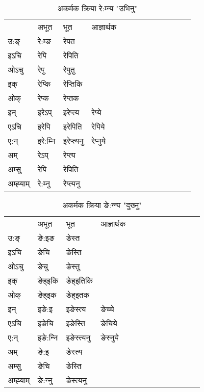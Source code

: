 \begin{table}[H]
\label{ep.vi} \centering
\caption{अकर्मक क्रिया  रे:म्‍न्य  "उभिनु"  }
\begin{tabular}{l|l|l|l|l|l|l|l|l|l|l|l|l}  \toprule
&अभूत & भूत & आज्ञार्थक \\ 
उ:ङ्‌ &रे:म्ङ &रेपत \\ 
इऽचि &रेपि &रेपिति   \\ 
ओऽचु &रेपु &रेपुतु   \\ 
इक् &रेप्कि &रेप्‍तिकि   \\ 
ओक् &रेप्क &रेप्‍तक   \\ 
इन् & इरेऽप् & इरेप्‍त्य &रेप्ये  \\ 
एऽचि & इरेपि & इरेपिति &रेपिये    \\ 
ए:न् & इरे:म्‍नि  & इरेप्‍त्यनु &रेप्‍नुये  \\ 
अम् & रेऽप् & रेप्‍त्य   \\ 
अम्सु & रेपि & रेपिति   \\ 
अम्ह्‍याम् & रे:म्‍नु  & रेप्‍त्यनु \\ 
\bottomrule
\end{tabular}
\end{table}


\begin{table}[H]
\label{et.vi} \centering
\caption{अकर्मक क्रिया  ङे:न्‍न्य  "दुख्‍नु"  }
\begin{tabular}{l|l|l|l|l|l|l|l|l|l|l|l|l}  \toprule
&अभूत & भूत & आज्ञार्थक \\ 
उ:ङ्‌ &ङे:इङ &ङेस्त \\ 
इऽचि &ङेचि &ङेस्ति   \\ 
ओऽचु &ङेचु &ङेस्तु   \\ 
इक् &ङेह्इकि &ङेह्इतिकि   \\ 
ओक् &ङेह्इक &ङेह्इतक   \\ 
इन् & इङे:इ & इङेस्त्य &ङेच्‍चे  \\ 
एऽचि & इङेचि & इङेस्ति &ङेचिये    \\ 
ए:न् & इङे:न्‍नि  & इङेस्त्यनु &ङेस्‍नुये  \\ 
अम् & ङे:इ & ङेस्त्य   \\ 
अम्सु & ङेचि & ङेस्ति   \\ 
अम्ह्‍याम् & ङे:न्‍नु  & ङेस्त्यनु \\ 
\bottomrule
\end{tabular}
\end{table}



